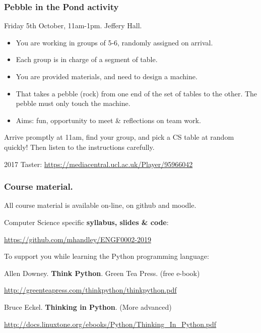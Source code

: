 \documentclass{beamer} %
\newcommand\emc[1]{\textcolor{midred}{\textbf{#1}}}
\begin{document}
\begin{frame}
\frametitle{Pebble in the Pond activity} 

Friday 5th October, 11am-1pm. Jeffery Hall.

\begin{itemize}
	\item You are working in groups of 5-6, randomly assigned on arrival.
	\item Each group is in charge of a segment of table.
	\item You are provided materials, and need to design a machine.
	\item That takes a pebble (rock) from one end of the set of tables to the other. The pebble must only touch the machine.
	\item Aims: fun, opportunity to meet \& reflections on team work.
\end{itemize}


Arrive promptly at 11am, find your group, and pick a CS table at random quickly! Then listen to the instructions carefully.

\vspace{0.24in}
2017 Taster: \url{https://mediacentral.ucl.ac.uk/Player/95966042}
\end{frame}

\begin{frame}
\frametitle{Course material.} 

All course material is available on-line, on github and moodle.

\vspace{7mm}
Computer Science specific \emc{syllabus, slides \& code}: 

\url{https://github.com/mhandley/ENGF0002-2019}

\vspace{7mm}
To support you while learning the Python programming language:

\vspace{2mm}
Allen Downey. \emc{Think Python}. Green Tea Press. (free e-book)

{\small \url{http://greenteapress.com/thinkpython/thinkpython.pdf} }

\vspace{2mm}
Bruce Eckel. \emc{Thinking in Python}. (More advanced)

{\small \url{http://docs.linuxtone.org/ebooks/Python/Thinking_In_Python.pdf} }


\end{frame}
\end{document}
